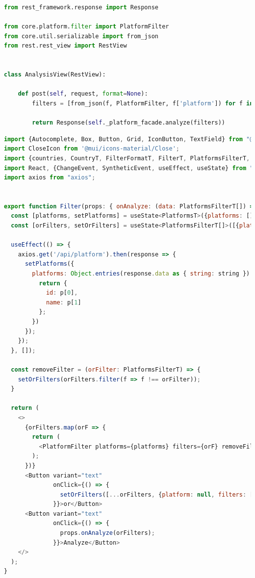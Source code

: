 \documentclass{article}
\begin{document}
\begin{lstlisting}[language=Python, caption=web.analysis\_api.analysis\_view]
from rest_framework.response import Response

from core.platform.filter import PlatformFilter
from core.util.serializable import from_json
from rest.rest_view import RestView


class AnalysisView(RestView):

    def post(self, request, format=None):
        filters = [from_json(f, PlatformFilter, f['platform']) for f in request.data]

        return Response(self._platform_facade.analyze(filters))
\end{lstlisting}

\begin{lstlisting}[language=JavaScript, caption=src.components.filter.filter]
import {Autocomplete, Box, Button, Grid, IconButton, TextField} from "@mui/material";
import CloseIcon from '@mui/icons-material/Close';
import {countries, CountryT, FilterFormatT, FilterT, PlatformsFilterT, PlatformsT, PlatformT} from "../../types/types";
import React, {ChangeEvent, SyntheticEvent, useEffect, useState} from "react";
import axios from "axios";


export function Filter(props: { onAnalyze: (data: PlatformsFilterT[]) => void }) {
  const [platforms, setPlatforms] = useState<PlatformsT>({platforms: []});
  const [orFilters, setOrFilters] = useState<PlatformsFilterT[]>([{platform: null, filters: []}]);

  useEffect(() => {
    axios.get('/api/platform').then(response => {
      setPlatforms({
        platforms: Object.entries(response.data as { string: string }).map((p: [string, string], i: number) => {
          return {
            id: p[0],
            name: p[1]
          };
        })
      });
    });
  }, []);

  const removeFilter = (orFilter: PlatformsFilterT) => {
    setOrFilters(orFilters.filter(f => f !== orFilter));
  }

  return (
    <>
      {orFilters.map(orF => {
        return (
          <PlatformFilter platforms={platforms} filters={orF} removeFilter={removeFilter}/>
        );
      })}
      <Button variant="text"
              onClick={() => {
                setOrFilters([...orFilters, {platform: null, filters: []}]);
              }}>or</Button>
      <Button variant="text"
              onClick={() => {
                props.onAnalyze(orFilters);
              }}>Analyze</Button>
    </>
  );
}



\end{lstlisting}
\end{document}

